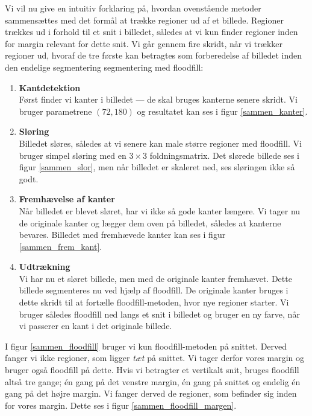 {
Vi vil nu give en intuitiv forklaring på, hvordan ovenstående metoder
sammensættes med det formål at trække regioner ud af et billede.
Regioner trækkes ud i forhold til et snit i billedet, således at vi kun
finder regioner inden for margin relevant for dette snit. Vi går gennem
fire skridt, når vi trækker regioner ud, hvoraf de tre første kan
betragtes som forberedelse af billedet inden den endelige segmentering
segmentering med floodfill:

\begin{enumerate}
    \item \textbf{Kantdetektion}\\
Først finder vi kanter i billedet --- de skal bruges kanterne senere
skridt. Vi bruger parametrene $(72, 180)$ og resultatet kan ses i figur
\ref{sammen_kanter}.

\item \textbf{Sløring}\\
Billedet sløres, således at vi senere kan male større regioner med
floodfill. Vi bruger simpel sløring med en $3\times3$ foldningsmatrix.
Det slørede billede ses i figur \ref{sammen_slor}, men når
billedet er skaleret ned, ses sløringen ikke så godt.

\item \textbf{Fremhævelse af kanter}\\
Når billedet er blevet sløret, har vi ikke så gode kanter længere. Vi
tager nu de originale kanter og lægger dem oven på billedet, således at
kanterne bevares. Billedet med fremhævede kanter kan ses i figur
\ref{sammen_frem_kant}.

\item \textbf{Udtrækning}\\
Vi har nu et sløret billede, men med de originale kanter fremhævet.
Dette billede segmenteres nu ved hjælp af floodfill. De originale kanter
bruges i dette skridt til at fortælle floodfill-metoden, hvor nye
regioner starter. Vi bruger således floodfill ned langs et snit i
billedet og bruger en ny farve, når vi passerer en kant i det originale
billede.
\end{enumerate}

I figur \ref{sammen_floodfill} bruger vi kun floodfill-metoden på
snittet. Derved fanger vi ikke regioner, som ligger \emph{tæt} på
snittet. Vi tager derfor vores margin og bruger også floodfill på dette.
Hvis vi betragter et vertikalt snit, bruges floodfill altså tre gange;
én gang på det venstre margin, én gang på snittet og endelig én gang på
det højre margin. Vi fanger derved de regioner, som befinder sig inden
for vores margin. Dette ses i figur \ref{sammen_floodfill_margen}.

}
